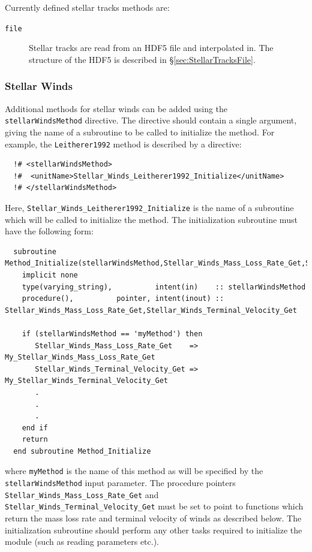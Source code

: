 Currently defined stellar tracks methods are:
\begin{description}
 \item [{\tt file}] Stellar tracks are read from an HDF5 file and interpolated in. The structure of the HDF5 is described in \S\ref{sec:StellarTracksFile}.
\end{description}

\subsubsection{Stellar Winds}

Additional methods for stellar winds can be added using the {\tt stellarWindsMethod} directive. The directive should contain a single argument, giving the name of a subroutine to be called to initialize the method. For example, the {\tt Leitherer1992} method is described by a directive:
\begin{verbatim}
  !# <stellarWindsMethod>
  !#  <unitName>Stellar_Winds_Leitherer1992_Initialize</unitName>
  !# </stellarWindsMethod>
\end{verbatim}
Here, {\tt Stellar\_Winds\_Leitherer1992\_Initialize} is the name of a subroutine which will be called to initialize the method. The initialization subroutine must have the following form:
\begin{verbatim}
  subroutine Method_Initialize(stellarWindsMethod,Stellar_Winds_Mass_Loss_Rate_Get,Stellar_Winds_Terminal_Velocity_Get)
    implicit none
    type(varying_string),          intent(in)    :: stellarWindsMethod
    procedure(),          pointer, intent(inout) :: Stellar_Winds_Mass_Loss_Rate_Get,Stellar_Winds_Terminal_Velocity_Get
    
    if (stellarWindsMethod == 'myMethod') then
       Stellar_Winds_Mass_Loss_Rate_Get    => My_Stellar_Winds_Mass_Loss_Rate_Get
       Stellar_Winds_Terminal_Velocity_Get => My_Stellar_Winds_Terminal_Velocity_Get
       .
       .
       .
    end if
    return
  end subroutine Method_Initialize
\end{verbatim}
where {\tt myMethod} is the name of this method as will be specified by the {\tt stellarWindsMethod} input parameter. The procedure pointers {\tt Stellar\_Winds\_Mass\_Loss\_Rate\_Get} and {\tt Stellar\_Winds\_Terminal\_Velocity\_Get} must be set to point to functions which return the mass loss rate and terminal velocity of winds as described below. The initialization subroutine should perform any other tasks required to initialize the module (such as reading parameters etc.).


